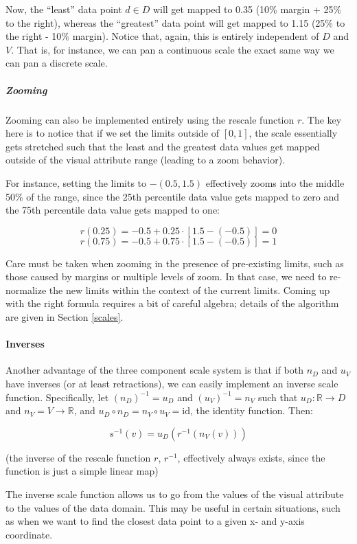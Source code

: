 \documentclass[
]{book}
\theoremstyle{definition}
\theoremstyle{definition}
\theoremstyle{definition}
\theoremstyle{definition}
\theoremstyle{remark}
\begin{document}
Now, the ``least'' data point \(d \in D\) will get mapped to 0.35 (10\% margin + 25\% to the right), whereas the ``greatest'' data point will get mapped to 1.15 (25\% to the right - 10\% margin). Notice that, again, this is entirely independent of \(D\) and \(V\). That is, for instance, we can pan a continuous scale the exact same way we can pan a discrete scale.

\subparagraph{Zooming}\label{zooming}

Zooming can also be implemented entirely using the rescale function \(r\). The key here is to notice that if we set the limits outside of \([0, 1]\), the scale essentially gets stretched such that the least and the greatest data values get mapped outside of the visual attribute range (leading to a zoom behavior).

For instance, setting the limits to \(-(0.5, 1.5)\) effectively zooms into the middle 50\% of the range, since the 25th percentile data value gets mapped to zero and the 75th percentile data value gets mapped to one:

\[r(0.25) = -0.5 + 0.25 \cdot [1.5 - (-0.5)] = 0\]
\[r(0.75) = -0.5 + 0.75 \cdot [1.5 - (-0.5)] = 1\]

Care must be taken when zooming in the presence of pre-existing limits, such as those caused by margins or multiple levels of zoom. In that case, we need to re-normalize the new limits within the context of the current limits. Coming up with the right formula requires a bit of careful algebra; details of the algorithm are given in Section \ref{scales}.

\paragraph{Inverses}\label{inverses}

Another advantage of the three component scale system is that if both \(n_D\) and \(u_V\) have inverses (or at least retractions), we can easily implement an inverse scale function. Specifically, let \((n_D)^{-1} = u_D\) and \((u_V)^{-1} = n_V\) such that \(u_D: \mathbb{R} \to D\) and \(n_V = V \to \mathbb{R}\), and \(u_D \circ n_D = n_V \circ u_V = \text{id}\), the identity function. Then:

\[s^{-1}(v) = u_D(r^{-1}(n_V(v)))\]

(the inverse of the rescale function \(r\), \(r^{-1}\), effectively always exists, since the function is just a simple linear map)

The inverse scale function allows us to go from the values of the visual attribute to the values of the data domain. This may be useful in certain situations, such as when we want to find the closest data point to a given x- and y-axis coordinate.
\end{document}
